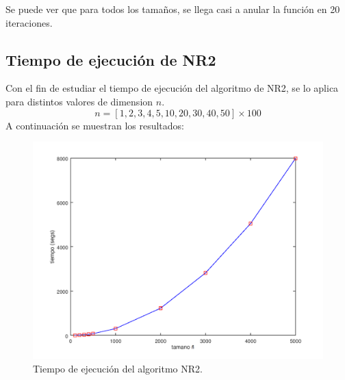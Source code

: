 \documentclass{endm}
\begin{document}
Se puede ver que para todos los tamaños, se llega casi a anular la función en 20 iteraciones.

\subsection{Tiempo de ejecución de NR2}
Con el fin de estudiar el tiempo de ejecución del algoritmo de NR2, se lo aplica para distintos valores de dimension $n$.
\begin{equation*}
    n = [1, 2, 3, 4, 5, 10, 20, 30, 40, 50] \times 100
\end{equation*}
A continuación se muestran los resultados:
\begin{figure}[h!]
    \includegraphics[width=\linewidth]{Grafica_5_3_1.png}
    \caption{Tiempo de ejecución del algoritmo NR2.}
    \label{fig:Grafica_5_3_1}
\end{figure}
\end{document}
